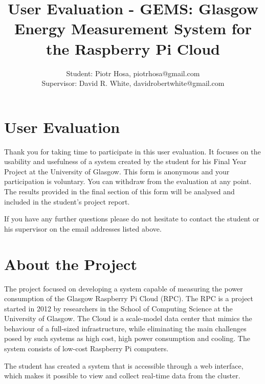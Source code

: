 \documentclass[12pt]{article}
\begin{document}

\title{User Evaluation - GEMS: Glasgow Energy Measurement System for the Raspberry Pi Cloud}
\author{Student: Piotr Hosa, piotrhosa@gmail.com\\Supervisor: David R. White, davidrobertwhite@gmail.com}
\date{\vspace{-5ex}}
\maketitle

\section{User Evaluation}
Thank you for taking time to participate in this user evaluation. It focuses on the usability and usefulness of a system created by the student for his Final Year Project at the University of Glasgow. This form is anonymous and your participation is voluntary. You can withdraw from the evaluation at any point. The results provided in the final section of this form will be analysed and included in the student's project report. 

If you have any further questions please do not hesitate to contact the student or his supervisor on the email addresses listed above.

\section{About the Project}
The project focused on developing a system capable of measuring the power consumption of the Glasgow Raspberry Pi Cloud (RPC). The RPC is a project started in 2012 by researchers in the School of Computing Science at the University of Glasgow. The Cloud is a scale-model data center that mimics the behaviour of a full-sized infrastructure, while eliminating the main challenges posed by such systems as high cost, high power consumption and cooling. The system consists of low-cost Raspberry Pi computers.

The student has created a system that is accessible through a web interface, which makes it possible to view and collect real-time data from the cluster. 
\end{document}
